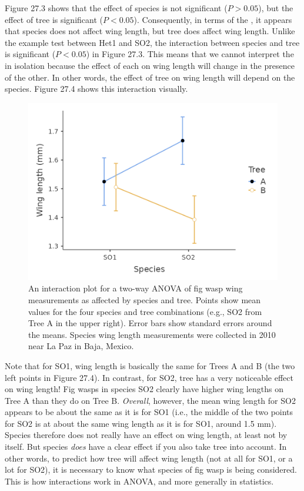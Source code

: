 \documentclass[
  openany]{krantz}
\begin{document}
Figure 27.3 shows that the effect of species is not significant (\(P > 0.05\)), but the effect of tree is significant (\(P < 0.05\)).
Consequently, in terms of the , it appears that species does not affect wing length, but tree does affect wing length.
Unlike the example test between Het1 and SO2, the interaction between species and tree is significant (\(P < 0.05\)) in Figure 27.3.
This means that we cannot interpret the  in isolation because the effect of each on wing length will change in the presence of the other.
In other words, the effect of tree on wing length will depend on the species.
Figure 27.4 shows this interaction visually.

\begin{figure}
\includegraphics[width=1\linewidth]{img/two-way_ANOVA_with_interaction} \caption{An interaction plot for a two-way ANOVA of fig wasp wing measurements as affected by species and tree. Points show mean values for the four species and tree combinations (e.g., SO2 from Tree A in the upper right). Error bars show standard errors around the means. Species wing length measurements were collected in 2010 near La Paz in Baja, Mexico.}\label{fig:unnamed-chunk-112}
\end{figure}

Note that for SO1, wing length is basically the same for Trees A and B (the two left points in Figure 27.4).
In contrast, for SO2, tree has a very noticeable effect on wing length!
Fig wasps in species SO2 clearly have higher wing lengths on Tree A than they do on Tree B.
\emph{Overall}, however, the mean wing length for SO2 appears to be about the same as it is for SO1 (i.e., the middle of the two points for SO2 is at about the same wing length as it is for SO1, around 1.5 mm).
Species therefore does not really have an effect on wing length, at least not by itself.
But species \emph{does} have a clear effect if you also take tree into account.
In other words, to predict how tree will affect wing length (not at all for SO1, or a lot for SO2), it is necessary to know what species of fig wasp is being considered.
This is how interactions work in ANOVA, and more generally in statistics.
\end{document}
